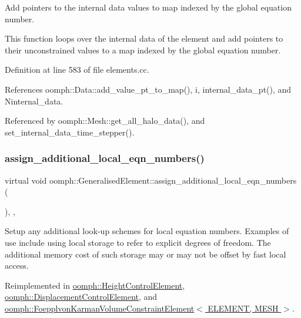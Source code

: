 Add pointers to the internal data values to map indexed by the global equation number. 

This function loops over the internal data of the element and add pointers to their unconstrained values to a map indexed by the global equation number. 

Definition at line 583 of file elements.\+cc.



References oomph\+::\+Data\+::add\+\_\+value\+\_\+pt\+\_\+to\+\_\+map(), i, internal\+\_\+data\+\_\+pt(), and Ninternal\+\_\+data.



Referenced by oomph\+::\+Mesh\+::get\+\_\+all\+\_\+halo\+\_\+data(), and set\+\_\+internal\+\_\+data\+\_\+time\+\_\+stepper().

\mbox{\label{classoomph_1_1GeneralisedElement_a4cdd0d1eef33b43f652c8f0b9e43967b}} 
\subsubsection{\texorpdfstring{assign\+\_\+additional\+\_\+local\+\_\+eqn\+\_\+numbers()}{assign\_additional\_local\_eqn\_numbers()}}
{\footnotesize\ttfamily virtual void oomph\+::\+Generalised\+Element\+::assign\+\_\+additional\+\_\+local\+\_\+eqn\+\_\+numbers (\begin{DoxyParamCaption}{ }\end{DoxyParamCaption})\hspace{0.3cm}{\ttfamily [inline]}, {\ttfamily [protected]}, {\ttfamily [virtual]}}



Setup any additional look-\/up schemes for local equation numbers. Examples of use include using local storage to refer to explicit degrees of freedom. The additional memory cost of such storage may or may not be offset by fast local access. 



Reimplemented in \hyperlink{classoomph_1_1HeightControlElement_a1d14c779f9ca1dcf26864406d6d32adb}{oomph\+::\+Height\+Control\+Element}, \hyperlink{classoomph_1_1DisplacementControlElement_a7911067dbe7a9dcfa3e981c9b6775c54}{oomph\+::\+Displacement\+Control\+Element}, and \hyperlink{classoomph_1_1FoepplvonKarmanVolumeConstraintElement_ab8879fad1a0804054520a2d7a57d940b}{oomph\+::\+Foepplvon\+Karman\+Volume\+Constraint\+Element$<$ E\+L\+E\+M\+E\+N\+T, M\+E\+S\+H $>$}.



